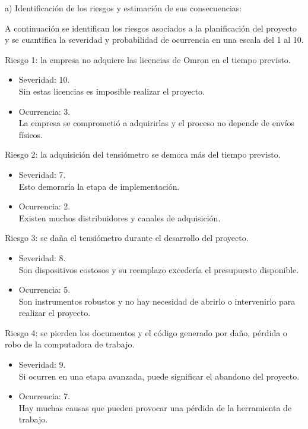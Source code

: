 \documentclass[
11pt, %
]{charter}
\begin{document}
a) Identificación de los riesgos y estimación de sus consecuencias:

A continuación se identifican los riesgos asociados a la planificación del proyecto y se cuantifica la severidad y probabilidad de ocurrencia en una escala del 1 al 10.

Riesgo 1: la empresa no adquiere las licencias de Omron en el tiempo previsto.
\begin{itemize}
	\item Severidad: 10.\\
	Sin estas licencias es imposible realizar el proyecto.
	\item Ocurrencia: 3.\\
	La empresa se comprometió a adquirirlas y el proceso no depende de envíos físicos.
\end{itemize}

Riesgo 2: la adquisición del tensiómetro se demora más del tiempo previsto.
\begin{itemize}
	\item Severidad: 7. \\
	Esto demoraría la etapa de implementación.
	\item Ocurrencia: 2.\\
	Existen muchos distribuidores y canales de adquisición.
\end{itemize}

Riesgo 3: se daña el tensiómetro durante el desarrollo del proyecto.
\begin{itemize}
	\item Severidad:  8.\\
	Son dispositivos costosos y su reemplazo excedería el presupuesto disponible.
	\item Ocurrencia: 5.\\
	Son instrumentos robustos y no hay necesidad de abrirlo o intervenirlo para realizar el proyecto.
\end{itemize}

Riesgo 4: se pierden los documentos y el código generado por daño, pérdida o robo de la computadora de trabajo.
\begin{itemize}
	\item Severidad: 9.\\
	Si ocurren en una etapa avanzada, puede significar el abandono del proyecto.
	\item Ocurrencia: 7.\\
	Hay muchas causas que pueden provocar una pérdida de la herramienta de trabajo.
\end{itemize}
\end{document}
